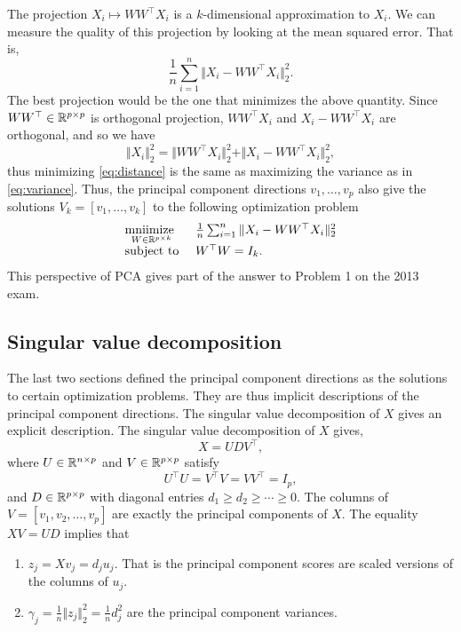 The projection $X_i \mapsto WW^\top X_i$ is a $k$-dimensional approximation to $X_i$. We can measure the quality of this projection by looking at the mean squared error. That is,
\begin{equation}\label{eq:distance}\frac{1}{n}\sum_{i=1}^n \Vert X_i - WW^\top X_i \Vert_2^2. \end{equation}
The best projection would be the one that minimizes the above quantity. Since $WW^\top \in \mathbb{R}^{p \times p}$ is orthogonal projection, $WW^\top X_i$ and $X_i-WW^\top X_i$ are orthogonal, and so we have
\[\Vert X_i\Vert_2^2 = \Vert WW^\top X_i \Vert_2^2 + \Vert X_i-WW^\top X_i \Vert_2^2, \]
thus minimizing \eqref{eq:distance} is the same as maximizing the variance as in \eqref{eq:variance}. Thus, the principal component directions $v_1,\ldots,v_p$ also give the solutions $V_k = [v_1,\ldots,v_k]$ to the following optimization problem
\[\begin{array}{ll}
    \underset{W \in \mathbb{R}^{p \times k}}{\mbox{mniimize }} &\frac{1}{n}\sum_{i=1}^n \Vert X_i - WW^\top X_i \Vert_2^2\\
    \mbox{subject to }& W^\top W = I_k.
\end{array} \]
This perspective of PCA gives part of the answer to Problem 1 on the 2013 exam.


\subsection{Singular value decomposition}

The last two sections defined the principal component directions as the solutions to certain optimization problems. They are thus implicit descriptions of the principal component directions. The singular value decomposition of $X$ gives an explicit description. The singular value decomposition of $X$ gives,
\[X = UDV^\top, \]
where $U \in \mathbb{R}^{n \times p}$ and $V \in \mathbb{R}^{p \times p}$ satisfy
\[U^\top U = V^\top V = VV^\top = I_p, \]
and $D \in \mathbb{R}^{p \times p}$ with diagonal entries $d_1 \ge d_2 \ge \cdots \ge 0$. The columns of $V =[v_1,v_2,\ldots,v_p]$ are exactly the principal components of $X$. The equality $XV = UD$ implies that
\begin{enumerate}
    \item $z_j = Xv_j = d_ju_j$. That is the principal component scores are scaled versions of the columns of $u_j$.
    \item $\gamma_j = \frac{1}{n}\Vert z_j \Vert_2^2 = \frac{1}{n}d_j^2$ are the principal component variances.
\end{enumerate}

